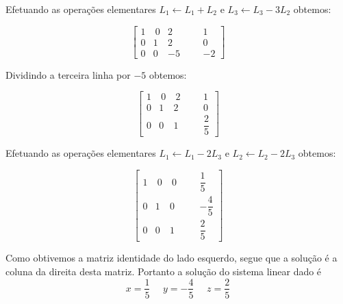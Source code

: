 \begin{solution}
	Efetuando as operações elementares $L_1 \leftarrow L_1 + L_2$ e $L_3 \leftarrow L_3 - 3L_2$ obtemos:

$$ \left[\begin{array}{rrrr|rr}
	1 & \  0 &   2 & & &   1  \\ 
	0 &    1 &   2 & & &   0  \\
	0 &    0 &  -5 & & &  -2  \end{array}\right] $$

Dividindo a terceira linha por $-5$ obtemos:

$$ \left[\begin{array}{rrrr|rr}
	1 & \  0 & \  2 & & &   1             \\[8pt]
	0 &    1 &    2 & & &   0             \\[8pt]
	0 &    0 &    1 & & &   \dfrac{2}{5}  \end{array}\right] $$

Efetuando as operações elementares $L_1 \leftarrow L_1 - 2L_3$ e $L_2 \leftarrow L_2 - 2L_3$ obtemos:

$$ \left[\begin{array}{rrrr|rr}
	1 & \  0 & \  0 & & &    \dfrac{1}{5}        \\[13pt]
	0 &    1 &    0 & & &   -\dfrac{4}{5}        \\[13pt]
	0 &    0 &    1 & & &    \dfrac{2}{5}        \end{array}\right] $$

Como obtivemos a matriz identidade do lado esquerdo, segue que a solução é a coluna da direita desta matriz. 
Portanto a solução do sistema linear dado é
$$x=\dfrac{1}{5} \ \ \ \ \ \ y = -\dfrac{4}{5} \ \ \ \ \ \ z=\dfrac{2}{5}$$
\end{solution}

